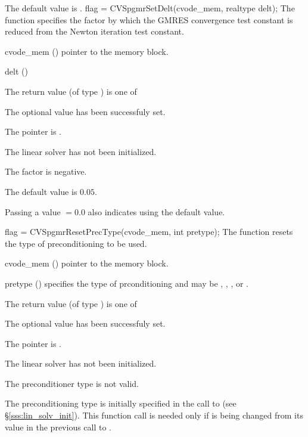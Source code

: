 {
  The default value is .
}
{
  flag = CVSpgmrSetDelt(cvode\_mem, realtype delt);
}
{
  The function  specifies the factor by
  which the GMRES convergence test constant is reduced
  from the Newton iteration test constant.
}
{
  \begin{args}
  \item[cvode\_mem] ()
    pointer to the {\cvodes} memory block.
  \item[delt] ()

  \end{args}
}
{
  The return value  (of type ) is one of
  \begin{args}
  \item[\Id{SUCCESS}] 
    The optional value has been successfuly set.
  \item[\Id{LIN\_NO\_MEM}]
    The  pointer is .
  \item[\Id{LIN\_NO\_LMEM}]
    The {\cvspgmr} linear solver has not been initialized.
  \item[\Id{LIN\_ILL\_INPUT}]
    The factor  is negative.  
  \end{args}
}
{
  The default value is $0.05$.

  Passing a value $ = 0.0$ also indicates using the default value.
}
{
  flag = CVSpgmrResetPrecType(cvode\_mem, int pretype);
}
{
  The function  resets the type
  of preconditioning to be used.
}
{
  \begin{args}
  \item[cvode\_mem] ()
    pointer to the {\cvodes} memory block.
  \item[pretype] ()
    specifies the type of prconditioning and may be
    , , , or .
  \end{args}
}
{
  The return value  (of type ) is one of
  \begin{args}
  \item[\Id{SUCCESS}] 
    The optional value has been successfuly set.
  \item[\Id{LIN\_NO\_MEM}]
    The  pointer is .
  \item[\Id{LIN\_NO\_LMEM}]
    The {\cvspgmr} linear solver has not been initialized.
  \item[\Id{LIN\_ILL\_INPUT}]
    The preconditioner type  is not valid.
  \end{args}
}
{
  The preconditioning type is initially specified in the call
  to  (see \S\ref{sss:lin_solv_init}). This function call is
  needed only if  is being changed from its value in the
  previous call to .
}

